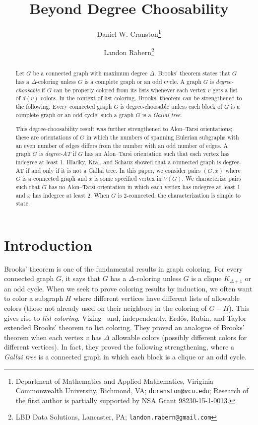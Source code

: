 \documentclass[12pt]{article}
\theoremstyle{plain}
\theoremstyle{definition}
\theoremstyle{remark}
\def\erdos{Erd\H{o}s}
\begin{document}
\title{Beyond Degree Choosability}
\author{Daniel W. Cranston\thanks{Department of Mathematics and Applied
Mathematics, Viriginia Commonwealth University, Richmond, VA;
\texttt{dcranston@vcu.edu}; 
Research of the first author is partially supported by NSA Grant
98230-15-1-0013.}
\and
Landon Rabern\thanks{LBD Data Solutions, Lancaster, PA;
\texttt{landon.rabern@gmail.com}}
}

\maketitle
\begin{abstract}
Let $G$ be a connected graph with maximum degree $\Delta$.  Brooks' theorem
states that $G$ has a $\Delta$-coloring unless $G$ is a complete graph or an
odd cycle.  A graph $G$ is \emph{degree-choosable} if $G$ can be properly
colored from its lists whenever each vertex $v$ gets a list of $d(v)$ colors.
In the context of list coloring, Brooks' theorem can be strengthened to the
following.  Every connected graph $G$ is degree-choosable unless each block of
$G$ is a complete graph or an odd cycle; such a graph $G$ is a \emph{Gallai
tree}.  

This degree-choosability result was further strengthened to Alon--Tarsi orientations;
these are orientations of $G$ in which the numbers of spanning Eulerian
subgraphs with an even number of edges differs from the number with an odd
number of edges.  A graph $G$ is \emph{degree-AT} if $G$ has an Alon--Tarsi
orientation such that each vertex has indegree at least 1.  Hladky, Kral, and
Schauz showed that a connected graph is degree-AT if and only if it is not a
Gallai tree.  In this paper, we consider pairs $(G,x)$ where $G$ is a connected
graph and $x$ is some specified vertex in $V(G)$.  We characterize pairs such
that $G$ has no Alon--Tarsi orientation in which each vertex has indegree at
least 1 and $x$ has indegree at least 2.  When $G$ is 2-connected, the
characterization is simple to state.
\end{abstract}

\section{Introduction}

Brooks' theorem is one of the fundamental results in graph coloring.
For every connected graph $G$, it says that $G$ has a $\Delta$-coloring
unless $G$ is a clique $K_{\Delta+1}$ or an odd cycle.  When we seek to prove coloring
results by induction, we often want to color a subgraph $H$ where different vertices
have different lists of allowable colors (those not already used on their
neighbors in the coloring of $G-H$).  This gives rise to \emph{list coloring}.
Vizing~\cite{vizing1976} and, independently, \erdos, Rubin, and
Taylor~\cite{ERT} extended Brooks'
theorem to list coloring. They proved an analogue of Brooks' theorem
when each vertex $v$ has $\Delta$ allowable colors (possibly
different colors for different vertices).  In fact, they proved the following
strengthening, where a \emph{Gallai tree} is a connected graph in which each
block is a clique or an odd cycle.  
\end{document}
